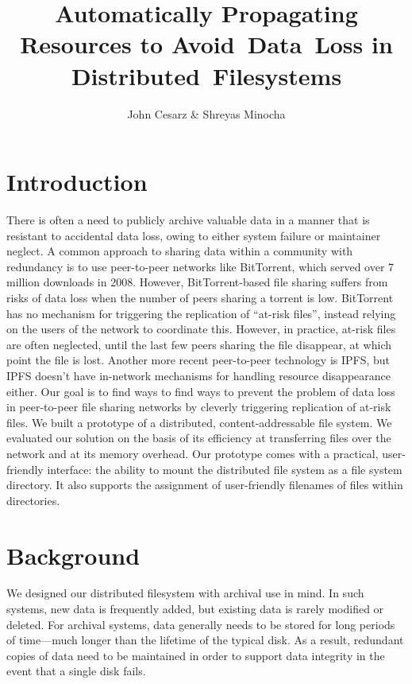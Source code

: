 \documentclass[twocolumn]{article}
\title{Automatically Propagating Resources to Avoid~Data~Loss in Distributed~Filesystems}
\author{John Cesarz \& Shreyas Minocha}
\begin{document}
\maketitle

\section{Introduction}

There is often a need to publicly archive valuable data in a manner that is resistant to accidental data loss, owing to either system failure or maintainer neglect.\cite{shi-2019}
A common approach to sharing data within a community with redundancy is to use peer-to-peer networks like BitTorrent, which served over 7 million downloads in 2008.\cite{zhang-2011}
However, BitTorrent-based file sharing suffers from risks of data loss when the number of peers sharing a torrent is low.
BitTorrent has no mechanism for triggering the replication of ``at-risk files'', instead relying on the users of the network to coordinate this.
However, in practice, at-risk files are often neglected, until the last few peers sharing the file disappear, at which point the file is lost.\cite{zhang-2011}
Another more recent peer-to-peer technology is IPFS\cite{trautwein-2022}, but IPFS doesn't have in-network mechanisms for handling resource disappearance either.
Our goal is to find ways to find ways to prevent the problem of data loss in peer-to-peer file sharing networks by cleverly triggering replication of at-risk files.
We built a prototype of a distributed, content-addressable file system.
We evaluated our solution on the basis of its efficiency at transferring files over the network and at its memory overhead.
Our prototype comes with a practical, user-friendly interface: the ability to mount the distributed file system as a file system directory.
It also supports the assignment of user-friendly filenames of files within directories.

\section{Background}

We designed our distributed filesystem with archival use in mind.
In such systems, new data is frequently added, but existing data is rarely modified or deleted.
For archival systems, data generally needs to be stored for long periods of time—much longer than the lifetime of the typical disk.
As a result, redundant copies of data need to be maintained in order to support data integrity in the event that a single disk fails.
\end{document}
